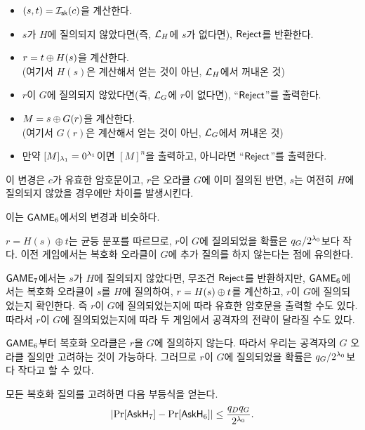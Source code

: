 \begin{tcolorbox}
	\begin{itemize}
		\item $(s,t) = \mathcal{I}_{\textsf{sk}}(c)$을 계산한다.
		\item $s$가 $H$에 질의되지 않았다면(즉, $\mathcal{L}_H$에 $s$가 없다면), $\textsf{Reject}$를 반환한다.
		\item $r = t \oplus H(s)$을 계산한다. \\ (여기서 $H(s)$은 계산해서 얻는 것이 아닌, $\mathcal{L}_H$에서 꺼내온 것)
		\item $r$이 $G$에 질의되지 않았다면(즉, $\mathcal{L}_G$에 $r$이 없다면), “$\textsf{Reject}$”를 출력한다.
		\item $M = s \oplus G(r)$을 계산한다. \\ (여기서 $G(r)$은 계산해서 얻는 것이 아닌, $\mathcal{L}_G$에서 꺼내온 것)
		\item 만약 $[M]_{\lambda_1} = 0^{\lambda_1}$이면 $[M]^{n}$을 출력하고,
		아니라면 “$\textsf{Reject}$”를 출력한다.
	\end{itemize}
\end{tcolorbox}

이 변경은 $c$가 유효한 암호문이고, $r$은 오라클 $G$에 이미 질의된 반면, $s$는
여전히 $H$에 질의되지 않았을 경우에만 차이를 발생시킨다.

\begin{memo}
	이는 $\textsf{GAME}_6$에서의 변경과 비슷하다.
\end{memo}

$r = H(s) \oplus t$는 균등 분포를 따르므로, $r$이 $G$에 질의되었을 확률은 $q_G /
2^{\lambda_0}$보다 작다. 이전 게임에서는 복호화 오라클이 $G$에 추가 질의를 하지 않는다는
점에 유의한다. 

\begin{memo}
	$\textsf{GAME}_7$에서는 $s$가 $H$에 질의되지 않았다면, 무조건 $\textsf{Reject}$를
	반환하지만, $\textsf{GAME}_6$에서는 복호화 오라클이 $s$를 $H$에 질의하여, $r = H(s)
	\oplus t$를 계산하고, $r$이 $G$에 질의되었는지 확인한다. 즉 $r$이 $G$에
	질의되었는지에 따라 유효한 암호문을 출력할 수도 있다. 따라서 $r$이 $G$에
	질의되었는지에 따라 두 게임에서 공격자의 전략이 달라질 수도 있다.
\end{memo}

\begin{memo}
	$\textsf{GAME}_6$부터 복호화 오라클은 $r$을 $G$에 질의하지 않는다. 따라서 우리는
	공격자의 $G$ 오라클 질의만 고려하는 것이 가능하다. 그러므로 $r$이 $G$에
	질의되었을 확률은 $q_G / 2^{\lambda_0}$보다 작다고 할 수 있다.
\end{memo}

모든 복호화 질의를 고려하면 다음 부등식을 얻는다.
$$
	\left| \Pr[\textsf{AskH}_7] - \Pr[\textsf{AskH}_6] \right| \leq \frac{q_D q_G}{2^{\lambda_0}}.
$$

